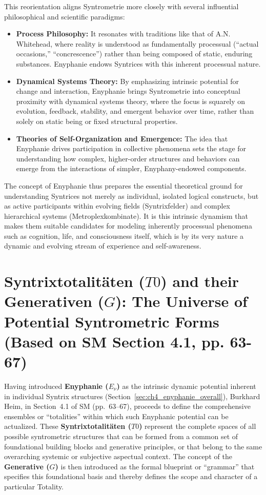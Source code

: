 \documentclass[
    12pt,              %
    a4paper,           %
    headings=normal,   %
    twoside=true,      %
    BCOR=8mm,          %
]{scrbook}
\newcommand{\q}[1]{\enquote{#1}}
\newcommand{\syntrixtotalitaet}{T0}
\newcommand{\generative}{G}
\begin{document}
This reorientation aligns Syntrometrie more closely with several influential philosophical and scientific paradigms:
\begin{itemize}
    \item   \textbf{Process Philosophy:} It resonates with traditions like that of A.N. Whitehead, where reality is understood as fundamentally processual (\q{actual occasions,} \q{concrescence}) rather than being composed of static, enduring substances. Enyphanie endows Syntrices with this inherent processual nature.
    \item   \textbf{Dynamical Systems Theory:} By emphasizing intrinsic potential for change and interaction, Enyphanie brings Syntrometrie into conceptual proximity with dynamical systems theory, where the focus is squarely on evolution, feedback, stability, and emergent behavior over time, rather than solely on static being or fixed structural properties.
    \item   \textbf{Theories of Self-Organization and Emergence:} The idea that Enyphanie drives participation in collective phenomena sets the stage for understanding how complex, higher-order structures and behaviors can emerge from the interactions of simpler, Enyphany-endowed components.
\end{itemize}
The concept of Enyphanie thus prepares the essential theoretical ground for understanding Syntrices not merely as individual, isolated logical constructs, but as active participants within evolving fields (Syntrixfelder) and complex hierarchical systems (Metroplexkombinate). It is this intrinsic dynamism that makes them suitable candidates for modeling inherently processual phenomena such as cognition, life, and consciousness itself, which is by its very nature a dynamic and evolving stream of experience and self-awareness.

\section{Syntrixtotalitäten (\(\syntrixtotalitaet\)) and their Generativen (\(\generative\)): The Universe of Potential Syntrometric Forms (Based on SM Section 4.1, pp. 63-67)}
\label{sec:ch4_syntrixtotalitaeten_generativen_overall} 

Having introduced \textbf{Enyphanie (\(E_\nu\))} as the intrinsic dynamic potential inherent in individual Syntrix structures (Section~\ref{sec:ch4_enyphanie_overall}), Burkhard Heim, in Section~4.1 of SM (pp.~63--67), proceeds to define the comprehensive ensembles or \q{totalities} within which such Enyphanic potential can be actualized. These \textbf{Syntrixtotalitäten (\(\syntrixtotalitaet\))} represent the complete spaces of all possible syntrometric structures that can be formed from a common set of foundational building blocks and generative principles, or that belong to the same overarching systemic or subjective aspectual context. The concept of the \textbf{Generative (\(\generative\))} is then introduced as the formal blueprint or \q{grammar} that specifies this foundational basis and thereby defines the scope and character of a particular Totality.
\end{document}
